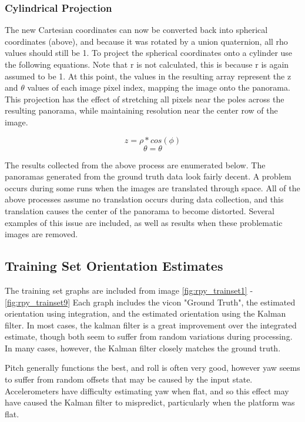 \documentclass[a4paper]{article}
\begin{document}
\subsubsection{Cylindrical Projection}

The new Cartesian coordinates can now be converted back into spherical coordinates (above), and because it was rotated by a union quaternion, all rho values should still be 1. To project the spherical coordinates onto a cylinder use the following equations. Note that r is not calculated, this is because r is again assumed to be 1. At this point, the values in the resulting array represent the z and $\theta$ values of each image pixel index, mapping the image onto the panorama. This projection has the effect of stretching all pixels near the poles across the resulting panorama, while maintaining resolution near the center row of the image.

\begin{equation*}
z = \rho * cos(\phi)
\end{equation*}
\begin{equation*}
\theta = \theta
\end{equation*}

The results collected from the above process are enumerated below. The panoramas generated from the ground truth data look fairly decent. A problem occurs during some runs when the images are translated through space. All of the above processes assume no translation occurs during data collection, and this translation causes the center of the panorama to become distorted. Several examples of this issue are included, as well as results when these problematic images are removed.

\subsection{Training Set Orientation Estimates}

The training set graphs are included from image \ref{fig:rpy_trainset1} - \ref{fig:rpy_trainset9} Each graph includes the vicon "Ground Truth", the estimated orientation using integration, and the estimated orientation using the Kalman filter. In most cases, the kalman filter is a great improvement over the integrated estimate, though both seem  to suffer from random variations during processing. In many cases, however, the Kalman filter closely matches the ground truth.

Pitch generally functions the best, and roll is often very good, however yaw seems to suffer from random offsets that may be caused by the input state. Accelerometers have difficulty estimating yaw when flat, and so this effect may have caused the Kalman filter to mispredict, particularly when the platform was flat.
\end{document}
